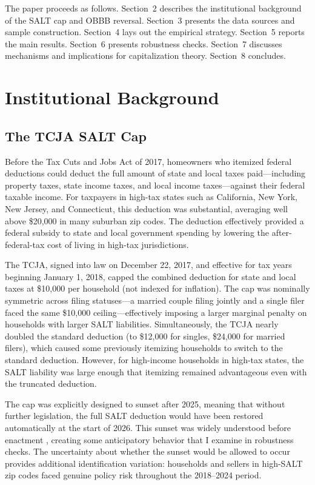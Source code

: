 \documentclass[12pt]{article}
\begin{document}
The paper proceeds as follows. Section~2 describes the institutional background of the SALT cap and OBBB reversal. Section~3 presents the data sources and sample construction. Section~4 lays out the empirical strategy. Section~5 reports the main results. Section~6 presents robustness checks. Section~7 discusses mechanisms and implications for capitalization theory. Section~8 concludes.

\section{Institutional Background}

\subsection{The TCJA SALT Cap}

Before the Tax Cuts and Jobs Act of 2017, homeowners who itemized federal deductions could deduct the full amount of state and local taxes paid---including property taxes, state income taxes, and local income taxes---against their federal taxable income. For taxpayers in high-tax states such as California, New York, New Jersey, and Connecticut, this deduction was substantial, averaging well above \$20,000 in many suburban zip codes. The deduction effectively provided a federal subsidy to state and local government spending by lowering the after-federal-tax cost of living in high-tax jurisdictions.

The TCJA, signed into law on December 22, 2017, and effective for tax years beginning January 1, 2018, capped the combined deduction for state and local taxes at \$10,000 per household (not indexed for inflation). The cap was nominally symmetric across filing statuses---a married couple filing jointly and a single filer faced the same \$10,000 ceiling---effectively imposing a larger marginal penalty on households with larger SALT liabilities. Simultaneously, the TCJA nearly doubled the standard deduction (to \$12,000 for singles, \$24,000 for married filers), which caused some previously itemizing households to switch to the standard deduction. However, for high-income households in high-tax states, the SALT liability was large enough that itemizing remained advantageous even with the truncated deduction.

The cap was explicitly designed to sunset after 2025, meaning that without further legislation, the full SALT deduction would have been restored automatically at the start of 2026. This sunset was widely understood before enactment \citep{JCT2017}, creating some anticipatory behavior that I examine in robustness checks. The uncertainty about whether the sunset would be allowed to occur provides additional identification variation: households and sellers in high-SALT zip codes faced genuine policy risk throughout the 2018--2024 period.
\end{document}
